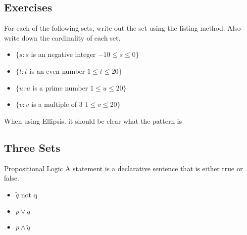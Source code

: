{{\subsection*{Exercises}
For each of the following sets, write out the set using the listing method.
Also write down the cardinality of each set.

\begin{itemize} 
\item $\{ s : s $ is an negative integer $ -10 \leq s \leq 0 \}$
\item $\{ t : t $ is an even number $ 1 \leq t \leq 20 \}$
\item $\{ u : u $ is a prime number $ 1 \leq u \leq 20 \}$
\item $\{ v : v $ is a multiple of 3 $ 1 \leq v \leq 20 \}$
\end{itemize}








When using Ellipsis, it should be clear what the pattern is













\subsection*{ Three Sets }






Propositional Logic A statement is a declarative sentence that
is either true or false.
\begin{itemize}
\item $\tilde q$ not q \item $p \vee q$ \item $p \wedge \tilde
q$
\end{itemize}



}}

